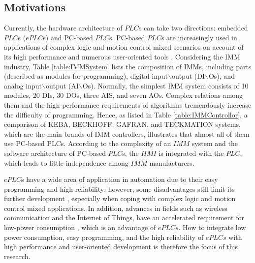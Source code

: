 \documentclass[journal,UTF8]{IEEEtran}
\begin{document}
\subsection{Motivations}
Currently, the hardware architecture of $PLC$s can take two directions: embedded $PLC$s ($ePLC$s) and PC-based $PLC$s. PC-based $PLC$s are increasingly used in applications of complex logic and motion control mixed scenarios on account of its high performance and numerous user-oriented tools \cite{Hossain2014Advanced}. Considering the IMM industry, Table \ref{table:IMMSystem} lists the composition of IMMs, including parts (described as modules for programming), digital input$\backslash$output (DI$\backslash$Os), and analog input$\backslash$output (AI$\backslash$Os). Normally, the simplest IMM system consists of 10 modules, 20 DIs, 30 DOs, three AIS, and seven AOs. Complex relations among them and the high-performance requirements of algorithms tremendously increase the difficulty of programming. Hence, as listed in Table \ref{table:IMMControllor}, a comparison of KEBA, BECKHOFF, GAFRAN, and TECKMATION systems, which are the main brands of IMM controllers, illustrates that almost all of them use PC-based PLCs. According to the complexity of an $IMM$ system and the software architecture of PC-based $PLC$s, the $HMI$ is integrated with the $PLC$, which leads to little independence among $IMM$ manufacturers. 
% 
% 

$ePLC$s have a wide area of application in automation due to their easy programming and high reliability; however, some disadvantages still limit its further development \cite{Hossain2014Advanced}, especially when coping with complex logic and motion control mixed applications. In addition, advances in fields such as wireless communication and the Internet of Things, have an accelerated requirement for low-power consumption \cite{Arshad2017Green}, which is an advantage of $ePLCs$. How to integrate low power consumption, easy programming, and the high reliability of $ePLCs$ with high performance and user-oriented development is therefore the focus of this research.
\end{document}
